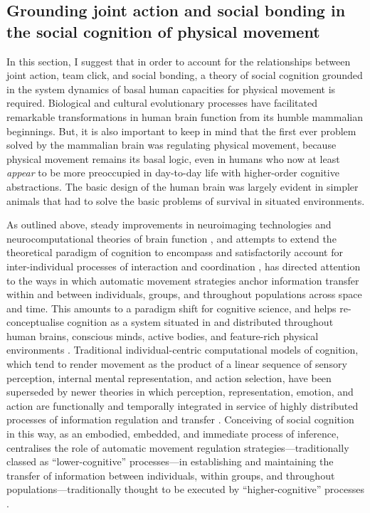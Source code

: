 \begin{mccorrection}
\section{Grounding joint action and social bonding in the social cognition of physical movement}
In this section, I suggest that in order to account for the relationships between joint action, team click, and social bonding, a theory of social cognition grounded in the system dynamics of basal human capacities for physical movement is required. Biological and cultural evolutionary processes have facilitated remarkable transformations in human brain function from its humble mammalian beginnings. But, it is also important to keep in mind that the first ever problem solved by the mammalian brain was regulating physical movement, because physical movement remains its basal logic, even in humans who now at least \textit{appear} to be more preoccupied in day-to-day life with higher-order cognitive abstractions.  The basic design of the human brain was largely evident in simpler animals that had to solve the basic problems of survival in situated environments\citep{Pezzulo2014}.
\end{mccorrection}

As outlined above, steady improvements in neuroimaging technologies \citep{Frith2007} and neurocomputational theories of brain function \citep{Friston2010,Frith2010}, and attempts to extend the theoretical paradigm of cognition to encompass and satisfactorily account for inter-individual processes of interaction and coordination \citep{Sebanz2006,Marsh2009,Dale2014}, has directed attention to the ways in which automatic movement strategies anchor information transfer within and between individuals, groups, and throughout populations across space and time.  This amounts to a paradigm shift for cognitive science, and helps re-conceptualise cognition as a system situated in and distributed throughout human brains, conscious minds, active bodies, and feature-rich physical environments \citep{Wilson2013}.
Traditional individual-centric computational models of cognition, which tend to render movement as the product of a linear sequence of sensory perception, internal mental representation, and action selection, have been superseded by newer theories in which perception, representation, emotion, and action are functionally and temporally integrated in service of highly distributed processes of information regulation and transfer \citep{Clark2013}.  Conceiving of social cognition in this way, as an embodied, embedded, and immediate process of inference, centralises the role of automatic movement regulation strategies---traditionally classed as ``lower-cognitive'' processes---in establishing and maintaining the transfer of information between individuals, within groups, and throughout populations---traditionally thought to be executed by  ``higher-cognitive'' processes \citep{Claidiere2014}.

